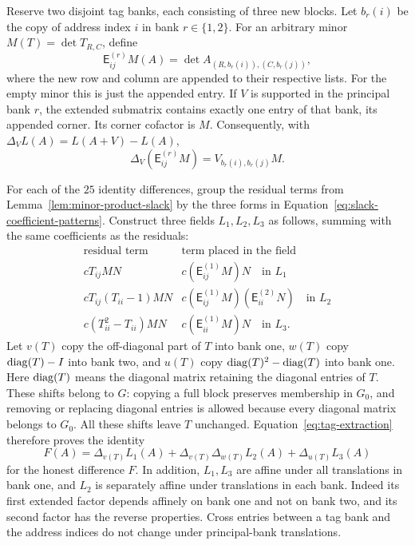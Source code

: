 Reserve two disjoint tag banks, each consisting of three new blocks.
Let $b_r(i)$ be the copy of address index $i$ in bank $r\in\{1,2\}$.
For an arbitrary minor $M(T)=\det T_{R,C}$, define
\[
 \mathsf E^{(r)}_{ij}M(A)
 =\det A_{(R,b_r(i)),(C,b_r(j))},
\]
where the new row and column are appended to their respective lists.
For the empty minor this is just the appended entry. If $V$ is
supported in the principal bank $r$, the extended submatrix contains
exactly one entry of that bank, its appended corner. Its corner
cofactor is $M$. Consequently, with
$\Delta_VL(A)=L(A+V)-L(A)$,
\begin{equation}\label{eq:tag-extraction}
 \Delta_V(\mathsf E^{(r)}_{ij}M)
 =V_{b_r(i),b_r(j)}M.
\end{equation}

For each of the $25$ identity differences, group the residual terms
from Lemma~\ref{lem:minor-product-slack} by the three forms in
Equation~\ref{eq:slack-coefficient-patterns}. Construct three fields
$L_1,L_2,L_3$ as follows, summing with the same coefficients as the
residuals:
\[
 \begin{array}{c|c}
 \text{residual term}&\text{term placed in the field}\\ \hline
 cT_{ij}MN&c(\mathsf E^{(1)}_{ij}M)N\quad\text{in }L_1\\
 cT_{ij}(T_{ii}-1)MN&
 c(\mathsf E^{(1)}_{ij}M)(\mathsf E^{(2)}_{ii}N)
       \quad\text{in }L_2\\
 c(T_{ii}^2-T_{ii})MN&
 c(\mathsf E^{(1)}_{ii}M)N\quad\text{in }L_3.
 \end{array}
\]
Let $v(T)$ copy the off-diagonal part of $T$ into bank one,
$w(T)$ copy $\operatorname{diag}(T)-I$ into bank two, and $u(T)$ copy
$\operatorname{diag}(T)^2-\operatorname{diag}(T)$ into bank one. Here $\operatorname{diag}(T)$ means the
diagonal matrix retaining the diagonal entries of $T$. These shifts
belong to $G$: copying a full block preserves membership in $G_0$, and
removing or replacing diagonal entries is allowed because every
diagonal matrix belongs to $G_0$.
All these shifts leave $T$ unchanged. Equation~\ref{eq:tag-extraction}
therefore proves the identity
\begin{equation}\label{eq:identity-with-slack}
 F(A)=\Delta_{v(T)}L_1(A)
       +\Delta_{v(T)}\Delta_{w(T)}L_2(A)
       +\Delta_{u(T)}L_3(A)
\end{equation}
for the honest difference $F$. In addition, $L_1,L_3$ are affine
under all translations in bank one, and $L_2$ is separately affine
under translations in each bank. Indeed its first extended factor
depends affinely on bank one and not on bank two, and its second
factor has the reverse properties. Cross entries between a tag bank
and the address indices do not change under principal-bank
translations.

